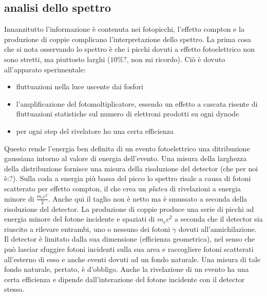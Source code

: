 \documentclass[11pt,a4paper]{article}
\begin{document}
\subsection{analisi dello spettro}
Innanzitutto l'informazione è contenuta nei fotopicchi, l'effetto compton e la produzione di coppie complicano l'interpretazione dello spettro. La prima cosa che si nota osservando lo spettro è che i picchi dovuti a effetto fotoelettrico non sono stretti, ma piuttosto larghi ($10\%?$, non mi ricordo). Ciò è dovuto all'apparato sperimentale:
\begin{itemize}
\item fluttuazioni nella luce uscente dai fosfori
\item l'amplificazione del fotomoltiplicatore, essendo un effetto a cascata risente di fluttuazioni statistiche sul numero di elettroni prodotti su ogni dynode
\item per ogni step del rivelatore ho una certa efficienza
\end{itemize}
Questo rende l'energia ben definita di un evento fotoelettrico una ditribuzione gaussiana intorno al valore di energia dell'evento. Una misura della larghezza della distribuzione fornisce una misura della risoluzione del detector (che per noi è:?).
Sulla coda a energia più bassa del picco lo spettro risale a causa di fotoni scatterato per effetto compton, il che crea un \textit{plateu} di rivelazioni a energia minore di $\frac{m_e c^2}{2}$. Anche qui il taglio non è netto ma è smussato a seconda della risoluzione del detector.
La produzione di coppie produce una serie di picchi ad energia minore del fotone incidente e spaziati di $m_e c^2$ a seconda che il detector sia riuscito a rilevare entrambi, uno o nessuno dei fotoni $\gamma$ dovuti all'annichilazione.
Il detector è limitato dalla sua dimensione (efficienza geometrica), nel senso che può lasciar sfuggire fotoni incidenti sulla sua area e raccogliere fotoni scatterati all'esterno di esso e anche eventi dovuti ad un fondo naturale. Una misura di tale fondo naturale, pertato, è d'obbligo.
Anche la rivelazione di un evento ha una certa efficienza e dipende dall'interazione del fotone incidente con il detector stesso.
\end{document}
